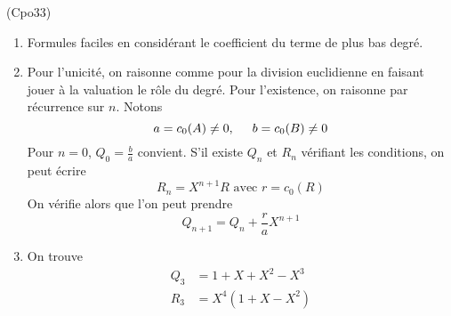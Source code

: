 \begin{tiny}(Cpo33)\end{tiny}
\begin{enumerate}
 \item Formules faciles en considérant le coefficient du terme de plus bas degré.
 \item Pour l'unicité, on raisonne comme pour la division euclidienne en faisant jouer à la valuation le rôle du degré. Pour l'existence, on raisonne par récurrence sur $n$. Notons
\begin{displaymath}
 a= c_0(A)\neq 0,\hspace{0.5cm} b = c_0(B)\neq 0
\end{displaymath}
Pour $n=0$, $Q_0=\frac{b}{a}$ convient.\newline
S'il existe $Q_n$ et $R_n$ vérifiant les conditions, on peut écrire 
\begin{displaymath}
 R_n=X^{n+1}R\text{ avec } r=c_0(R)
\end{displaymath}
 On vérifie alors que l'on peut prendre
\begin{displaymath}
 Q_{n+1}= Q_n+\frac{r}{a}X^{n+1}
\end{displaymath}
\item On trouve
\begin{align*}
 Q_3 &= 1+X+X^2-X^3\\
 R_3 &= X^4(1+X-X^2)
\end{align*}
\end{enumerate}
